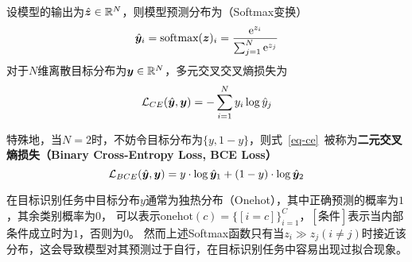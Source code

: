 \begin{definition}\label{def-cross-entropy}
  设模型的输出为$\hat{\boldsymbol{z}}\in\mathbb{R}^{N}$，则模型预测分布为（Softmax变换）
  \begin{equation}
    \hat{\boldsymbol{y}}_i = \text{softmax}(\boldsymbol{z})_i = \frac{\mathrm{e}^{z_i}}{\sum_{j=1}^N\mathrm{e}^{z_j}}
  \end{equation}
  对于$N$维离散目标分布为$\boldsymbol{y}\in\mathbb{R}^N$，多元交叉交叉熵损失为
  \begin{equation}\label{eq-ce}
    \mathcal{L}_{CE}(\hat{\boldsymbol{y}},\boldsymbol{y}) = -\sum_{i=1}^Ny_i\log\hat{y}_{j}
  \end{equation}

  特殊地，当$N=2$时，不妨令目标分布为$\{y, 1-y\}$，则式~\ref{eq-ce}~被称为\textbf{二元交叉熵损失（Binary Cross-Entropy Loss, BCE Loss）}
  \begin{equation}
    \mathcal{L}_{BCE}(\hat{\boldsymbol{y}},\boldsymbol{y}) = y\cdot \log\hat{\boldsymbol{y}}_{1} + (1-y)\cdot \log\hat{\boldsymbol{y}}_2
  \end{equation}
\end{definition}
在目标识别任务中目标分布$y$通常为独热分布（Onehot），其中正确预测的概率为$1$，其余类别概率为$0$，
可以表示$\text{onehot}(c) = \{[i=c]\}_{i=1}^C$，$[\text{条件}]$表示当内部条件成立时为$1$，否则为$0$。
然而上述Softmax函数只有当$z_i\gg z_j(i\neq j)$时接近该分布，这会导致模型对其预测过于自行，在目标识别任务中容易出现过拟合现象。
